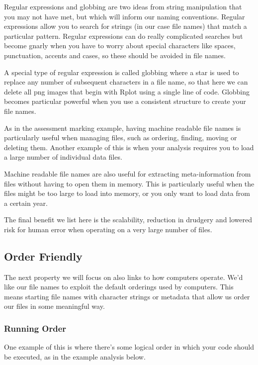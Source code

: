 \documentclass[
  12pt,
]{book}
\begin{document}
Regular expressions and globbing are two ideas from string manipulation that you may not have met, but which will inform our naming conventions. Regular expressions allow you to search for strings (in our case file names) that match a particular pattern. Regular expressions can do really complicated searches but become gnarly when you have to worry about special characters like spaces, punctuation, accents and cases, so these should be avoided in file names.

A special type of regular expression is called globbing where a star is used to replace any number of subsequent characters in a file name, so that here we can delete all png images that begin with Rplot using a single line of code. Globbing becomes particular powerful when you use a consistent structure to create your file names.

As in the assessment marking example, having machine readable file names is particularly useful when managing files, such as ordering, finding, moving or deleting them. Another example of this is when your analysis requires you to load a large number of individual data files.

Machine readable file names are also useful for extracting meta-information from files without having to open them in memory. This is particularly useful when the files might be too large to load into memory, or you only want to load data from a certain year.

The final benefit we list here is the scalability, reduction in drudgery and lowered risk for human error when operating on a very large number of files.

\hypertarget{order-friendly}{%
\subsection{Order Friendly}\label{order-friendly}}

The next property we will focus on also links to how computers operate. We'd like our file names to exploit the default orderings used by computers. This means starting file names with character strings or metadata that allow us order our files in some meaningful way.

\hypertarget{running-order}{%
\subsubsection{Running Order}\label{running-order}}

One example of this is where there's some logical order in which your code should be executed, as in the example analysis below.
\end{document}
